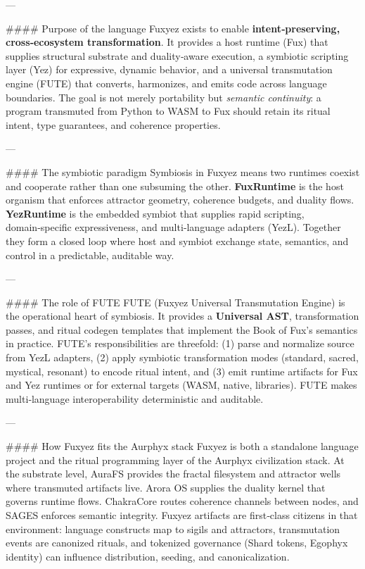 ---

\#\#\#\# Purpose of the language
Fuxyez exists to enable \textbf{intent‑preserving, cross‑ecosystem transformation}. It provides a host runtime (Fux) that supplies structural substrate and duality‑aware execution, a symbiotic scripting layer (Yez) for expressive, dynamic behavior, and a universal transmutation engine (FUTE) that converts, harmonizes, and emits code across language boundaries. The goal is not merely portability but \textit{semantic continuity}: a program transmuted from Python to WASM to Fux should retain its ritual intent, type guarantees, and coherence properties.

---

\#\#\#\# The symbiotic paradigm
Symbiosis in Fuxyez means two runtimes coexist and cooperate rather than one subsuming the other. \textbf{FuxRuntime} is the host organism that enforces attractor geometry, coherence budgets, and duality flows. \textbf{YezRuntime} is the embedded symbiot that supplies rapid scripting, domain‑specific expressiveness, and multi‑language adapters (YezL). Together they form a closed loop where host and symbiot exchange state, semantics, and control in a predictable, auditable way.

---

\#\#\#\# The role of FUTE
FUTE (Fuxyez Universal Transmutation Engine) is the operational heart of symbiosis. It provides a \textbf{Universal AST}, transformation passes, and ritual codegen templates that implement the Book of Fux’s semantics in practice. FUTE’s responsibilities are threefold: (1) parse and normalize source from YezL adapters, (2) apply symbiotic transformation modes (standard, sacred, mystical, resonant) to encode ritual intent, and (3) emit runtime artifacts for Fux and Yez runtimes or for external targets (WASM, native, libraries). FUTE makes multi‑language interoperability deterministic and auditable.

---

\#\#\#\# How Fuxyez fits the Aurphyx stack
Fuxyez is both a standalone language project and the ritual programming layer of the Aurphyx civilization stack. At the substrate level, AuraFS provides the fractal filesystem and attractor wells where transmuted artifacts live. Arora OS supplies the duality kernel that governs runtime flows. ChakraCore routes coherence channels between nodes, and SAGES enforces semantic integrity. Fuxyez artifacts are first‑class citizens in that environment: language constructs map to sigils and attractors, transmutation events are canonized rituals, and tokenized governance (Shard tokens, Egophyx identity) can influence distribution, seeding, and canonicalization.

